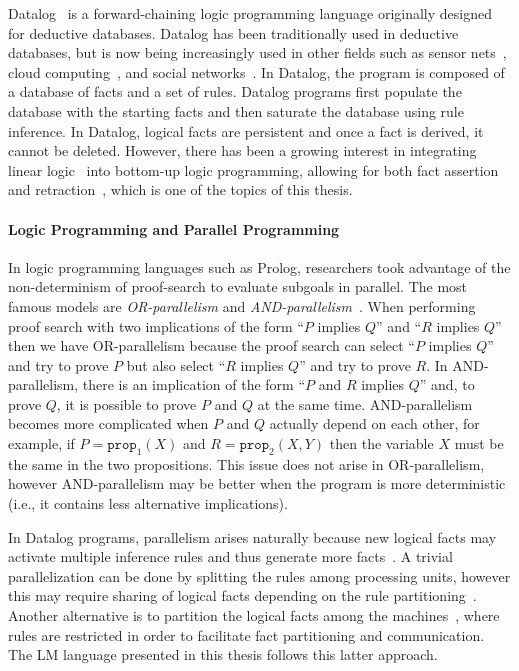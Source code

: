 Datalog~\cite{Ramakrishnan93asurvey,Ullman:1990:PDK:533142} is a
forward-chaining logic programming language originally designed for deductive
databases. Datalog has been traditionally used in deductive databases, but is
now being increasingly used in other fields such as sensor
nets~\cite{Chu:2007:DID:1322263.1322281}, cloud computing~\cite{alvaro:boom},
and social networks~\cite{Seo:2013:DSD:2556549.2556572}.  In Datalog, the
program is composed of a database of facts and a set of rules.  Datalog programs
first populate the database with the starting facts and then saturate the database using
rule inference. In Datalog, logical facts are persistent and once a fact is
derived, it cannot be deleted. However, there has been a growing interest in
integrating linear logic~\cite{girard-87} into bottom-up logic programming,
allowing for both fact assertion and
retraction~\cite{Chang03ajudgmental,Lopez:2005:MCL:1069774.1069778,simmons-lla,cruz-iclp14},
which is one of the topics of this thesis.

\paragraph{Logic Programming and Parallel Programming}

In logic programming languages such as Prolog, researchers took advantage of the
non-determinism of proof-search to evaluate subgoals in parallel. The most
famous models are \emph{OR-parallelism} and
\emph{AND-parallelism}~\cite{Gupta:2001:PEP:504083.504085}. When performing
proof search with two implications of the form ``$P$ implies $Q$'' and ``$R$
implies $Q$'' then we have OR-parallelism because the proof search can select ``$P$
implies $Q$'' and try to prove $P$ but also select ``$R$ implies $Q$'' and try
to prove $R$. In AND-parallelism, there is an implication of the form ``$P$ and
$R$ implies $Q$'' and, to prove $Q$, it is possible to prove $P$ and $Q$ at the
same time. AND-parallelism becomes more complicated when $P$ and $Q$ actually
depend on each other, for example, if $P = \mathtt{prop}_1(X)$ and $R =
\mathtt{prop}_2(X, Y)$ then the variable $X$ must be the same in the two
propositions. This issue does not arise in OR-parallelism, however AND-parallelism
may be better when the program is more deterministic (i.e., it contains less
alternative implications).

In Datalog programs, parallelism arises naturally because new logical facts may
activate multiple inference rules and thus generate more
facts~\cite{Ganguly:1990:FPP:93597.98724,Seib:1991:PDP:113413.113435,Wolfson:1988:DPL:971701.50242}.
A trivial parallelization can be done by splitting the rules among processing
units, however this may require sharing of logical facts depending on the rule
partitioning~\cite{Wolfson:1988:DPL:971701.50242}. Another alternative is to
partition the logical facts among the
machines~\cite{183073,Loo-condie-garofalakis-p2}, where rules are restricted in
order to facilitate fact partitioning and communication. The LM language
presented in this thesis follows this latter approach.

